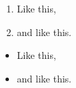 \begin{enumerate}
\item Like this,
\item and like this.
\end{enumerate}
\begin{itemize}
\item Like this,
\item and like this.
\end{itemize}